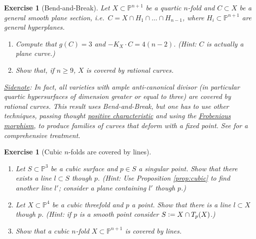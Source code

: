 \documentclass[a4paper,11pt]{amsart}
\newtheorem{exercise}[theorem]{Exercise}
\newcommand{\PP}{\mathbb{P}}
\newcommand{\defeq}{\vcentcolon=}
\begin{document}
\begin{exercise}[{Bend-and-Break}]
	Let $X \subset \PP^{n+1}$ be a quartic $n$-fold and $C \subset X$ be a general smooth plane section, i.e.\ $C = X \cap H_1 \cap \dots \cap H_{n-1}$, where $H_i \subset \PP^{n+1}$ are general hyperplanes. 
	\begin{enumerate}[resume]
		\item Compute that $g(C) = 3$ and $-K_X\cdot C = 4(n-2)$. {\small (Hint: $C$ is actually a plane curve.)}
		\item Show that, if $n \geq 9$, $X$ is covered by rational curves.
	\end{enumerate}
	\underline{Sidenote}: In fact, \emph{all} varieties with ample anti-canonical divisor (in particular quartic hypersurfaces of dimension greater or equal to three) are covered by rational curves.
	This result uses Bend-and-Break, but one has to use other techniques, passing thought \href{https://s-zikas.github.io/site/pics/charp.png}{positive characteristic} and using the \href{https://s-zikas.github.io/site/pics/complexGeometer.png}{Frobenious morphism}, to produce families of curves that deform with a fixed point.
	See \cite[Chapter $3$]{Debarre} for a comprehensive treatment.
\end{exercise}

\begin{exercise}[{Cubic $n$-folds are covered by lines}]\leavevmode
	\begin{enumerate}
		\item Let $S \subset \PP^3$ be a cubic surface and $p\in S$ a singular point.
		Show that there exists a line $l \subset S$ though $p$.
		{\small (Hint: Use Proposition \ref{prop:cubic} to find another line $l'$; consider a plane containing $l'$ though $p$.)}
		\item Let $X \subset \PP^4$ be a cubic threefold and $p$ a point.
		Show that there is a line $l\subset X$ though $p$.
		{\small (Hint: if $p$ is a smooth point consider $S \defeq X \cap T_p(X)$.)}
		\item Show that a cubic $n$-fold $X \subset \PP^{n+1}$ is covered by lines.
	\end{enumerate}
\end{exercise}
\end{document}
